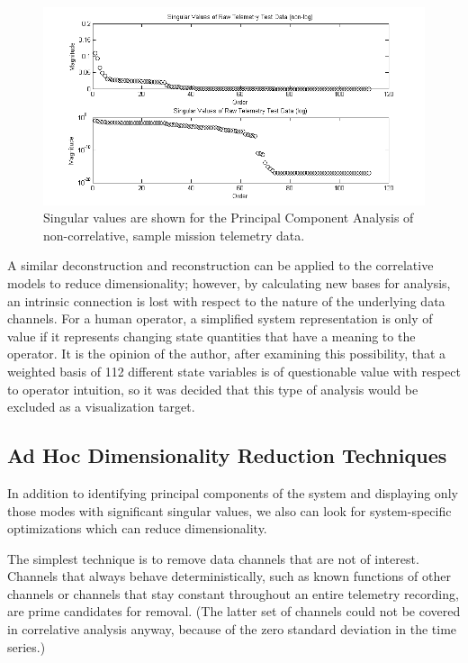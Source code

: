 \begin{figure}[h]
\centering
    \includegraphics[width=\columnwidth]{images/raw_telem_svs.png}
    \caption{Singular values are shown for the Principal Component Analysis of non-correlative, sample mission telemetry data.}
    \label{fig:raw_telem_svs}
\end{figure}

A similar deconstruction and reconstruction can be applied to the correlative models to reduce dimensionality; however, by calculating new bases for analysis, an intrinsic connection is lost with respect to the nature of the underlying data channels. For a human operator, a simplified system representation is only of value if it represents changing state quantities that have a meaning to the operator. It is the opinion of the author, after examining this possibility, that a weighted basis of 112 different state variables is of questionable value with respect to operator intuition, so it was decided that this type of analysis would be excluded as a visualization target.

\subsection{Ad Hoc Dimensionality Reduction Techniques}

In addition to identifying principal components of the system and displaying only those modes with significant singular values, we also can look for system-specific optimizations which can reduce dimensionality.

The simplest technique is to remove data channels that are not of interest. Channels that always behave deterministically, such as known functions of other channels or channels that stay constant throughout an entire telemetry recording, are prime candidates for removal. (The latter set of channels could not be covered in correlative analysis anyway, because of the zero standard deviation in the time series.)

